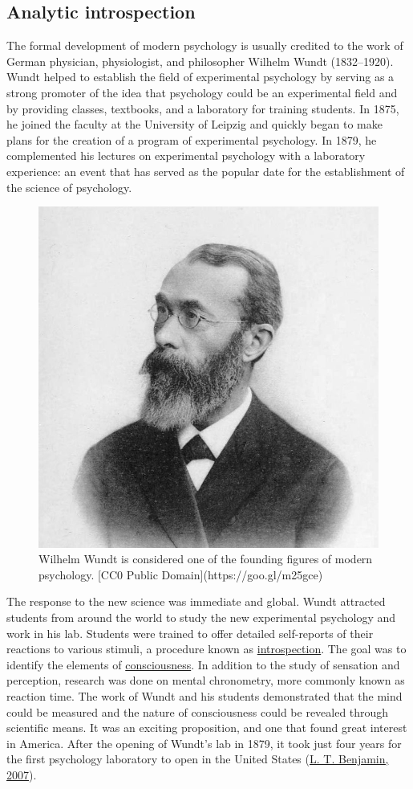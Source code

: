 \documentclass[
]{krantz}
\begin{document}
\hypertarget{analytic-introspection}{%
\subsection*{Analytic introspection}\label{analytic-introspection}}


The formal development of modern psychology is usually credited to the work of German physician, physiologist, and philosopher Wilhelm Wundt (1832--1920). Wundt helped to establish the field of experimental psychology by serving as a strong promoter of the idea that psychology could be an experimental field and by providing classes, textbooks, and a laboratory for training students. In 1875, he joined the faculty at the University of Leipzig and quickly began to make plans for the creation of a program of experimental psychology. In 1879, he complemented his lectures on experimental psychology with a laboratory experience: an event that has served as the popular date for the establishment of the science of psychology.

\begin{figure}

{\centering \includegraphics[width=0.4\linewidth]{images/ch1/wundt} 

}

\caption{Wilhelm Wundt is considered one of the founding figures of modern psychology. [CC0 Public Domain](https://goo.gl/m25gce)}\label{fig:wundt}
\end{figure}

The response to the new science was immediate and global. Wundt attracted students from around the world to study the new experimental psychology and work in his lab. Students were trained to offer detailed self-reports of their reactions to various stimuli, a procedure known as \protect\hyperlink{introspection}{introspection}. The goal was to identify the elements of \protect\hyperlink{consciousness}{consciousness}. In addition to the study of sensation and perception, research was done on mental chronometry, more commonly known as reaction time. The work of Wundt and his students demonstrated that the mind could be measured and the nature of consciousness could be revealed through scientific means. It was an exciting proposition, and one that found great interest in America. After the opening of Wundt's lab in 1879, it took just four years for the first psychology laboratory to open in the United States (\protect\hyperlink{ref-benjamin2007}{L. T. Benjamin, 2007}).
\end{document}
